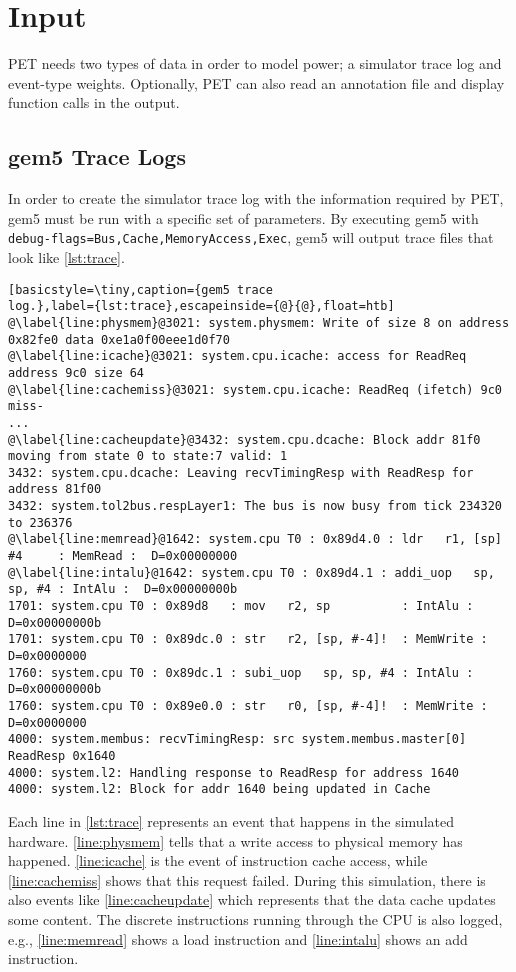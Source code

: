 \section{Input}

PET needs two types of data in order to model power; a simulator trace log and
event-type weights. Optionally, PET can also read an annotation file and display
function calls in the output.

\subsection{gem5 Trace Logs}
In order to create the simulator trace log with the information required by PET,
gem5 must be run with a specific set of parameters. By executing gem5 with
\texttt{\textemdash\textemdash
debug-flags=Bus,\allowbreak{}Cache,\allowbreak{}MemoryAccess,\allowbreak{}Exec},
gem5 will output trace files that look like \autoref{lst:trace}.

\begin{lstlisting}[basicstyle=\tiny,caption={gem5 trace
log.},label={lst:trace},escapeinside={@}{@},float=htb]
@\label{line:physmem}@3021: system.physmem: Write of size 8 on address 0x82fe0 data 0xe1a0f00eee1d0f70
@\label{line:icache}@3021: system.cpu.icache: access for ReadReq address 9c0 size 64
@\label{line:cachemiss}@3021: system.cpu.icache: ReadReq (ifetch) 9c0 miss-
...
@\label{line:cacheupdate}@3432: system.cpu.dcache: Block addr 81f0 moving from state 0 to state:7 valid: 1
3432: system.cpu.dcache: Leaving recvTimingResp with ReadResp for address 81f00
3432: system.tol2bus.respLayer1: The bus is now busy from tick 234320 to 236376
@\label{line:memread}@1642: system.cpu T0 : 0x89d4.0 : ldr   r1, [sp] #4     : MemRead :  D=0x00000000
@\label{line:intalu}@1642: system.cpu T0 : 0x89d4.1 : addi_uop   sp, sp, #4 : IntAlu :  D=0x00000000b
1701: system.cpu T0 : 0x89d8   : mov   r2, sp          : IntAlu :  D=0x00000000b
1701: system.cpu T0 : 0x89dc.0 : str   r2, [sp, #-4]!  : MemWrite :  D=0x0000000
1760: system.cpu T0 : 0x89dc.1 : subi_uop   sp, sp, #4 : IntAlu :  D=0x00000000b
1760: system.cpu T0 : 0x89e0.0 : str   r0, [sp, #-4]!  : MemWrite :  D=0x0000000
4000: system.membus: recvTimingResp: src system.membus.master[0] ReadResp 0x1640
4000: system.l2: Handling response to ReadResp for address 1640
4000: system.l2: Block for addr 1640 being updated in Cache
\end{lstlisting}

Each line in \autoref{lst:trace} represents an event that happens in the
simulated hardware.  \autoref{line:physmem} tells that a write access to
physical memory has happened. \autoref{line:icache} is the event of instruction
cache access, while \autoref{line:cachemiss} shows that this request failed.
During this simulation, there is also events like \autoref{line:cacheupdate}
which represents that the data cache updates some content. The discrete
instructions running through the CPU is also logged, e.g., \autoref{line:memread}
shows a load instruction and \autoref{line:intalu} shows an add instruction.

